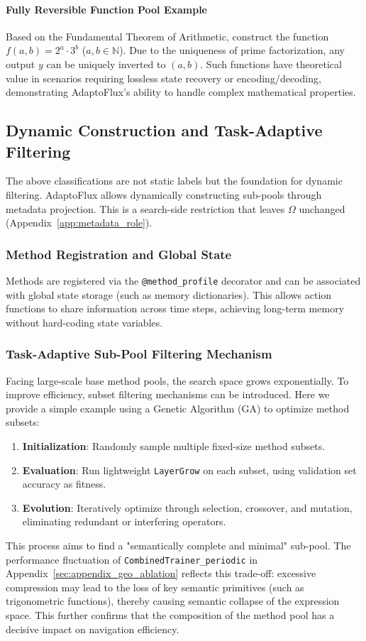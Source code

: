 \paragraph{Fully Reversible Function Pool Example}
Based on the Fundamental Theorem of Arithmetic, construct the function $f(a, b) = 2^a \cdot 3^b$ ($a,b \in \mathbb{N}$). Due to the uniqueness of prime factorization, any output $y$ can be uniquely inverted to $(a, b)$. Such functions have theoretical value in scenarios requiring lossless state recovery or encoding/decoding, demonstrating AdaptoFlux's ability to handle complex mathematical properties.

\subsection{Dynamic Construction and Task-Adaptive Filtering}

The above classifications are not static labels but the foundation for dynamic filtering. AdaptoFlux allows dynamically constructing sub-pools through metadata projection. This is a search-side restriction that leaves $\Omega$ unchanged (Appendix~\ref{app:metadata_role}).

\subsubsection{Method Registration and Global State}
Methods are registered via the \texttt{@method\_profile} decorator and can be associated with global state storage (such as memory dictionaries). This allows action functions to share information across time steps, achieving long-term memory without hard-coding state variables.

\subsubsection{Task-Adaptive Sub-Pool Filtering Mechanism}
Facing large-scale base method pools, the search space grows exponentially. To improve efficiency, subset filtering mechanisms can be introduced. Here we provide a simple example using a Genetic Algorithm (GA) to optimize method subsets:
\begin{enumerate}
    \item \textbf{Initialization}: Randomly sample multiple fixed-size method subsets.
    \item \textbf{Evaluation}: Run lightweight \texttt{LayerGrow} on each subset, using validation set accuracy as fitness.
    \item \textbf{Evolution}: Iteratively optimize through selection, crossover, and mutation, eliminating redundant or interfering operators.
\end{enumerate}
This process aims to find a "semantically complete and minimal" sub-pool. The performance fluctuation of \texttt{CombinedTrainer\_periodic} in Appendix~\ref{sec:appendix_geo_ablation} reflects this trade-off: excessive compression may lead to the loss of key semantic primitives (such as trigonometric functions), thereby causing semantic collapse of the expression space. This further confirms that the composition of the method pool has a decisive impact on navigation efficiency.

